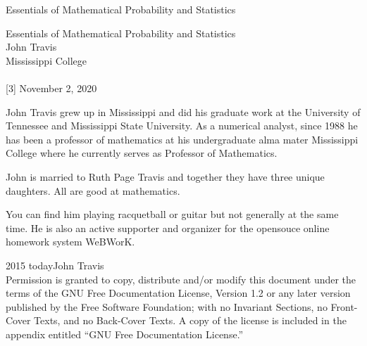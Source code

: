 \documentclass[oneside,10pt,]{book}
\newcommand{\titlepagefont}{\relax}
\numberwithin{equation}{section}
\begin{document}
\frontmatter
\thispagestyle{empty}
{\titlepagefont\centering
\vspace*{0.28\textheight}
{\Huge Essentials of Mathematical Probability and Statistics}\\}
\clearpage
\thispagestyle{empty}
{\titlepagefont\centering
\vspace*{0.14\textheight}
{\Huge Essentials of Mathematical Probability and Statistics}\\[3\baselineskip]
{\Large John Travis}\\[0.5\baselineskip]
{\Large Mississippi College}\\[3\baselineskip]
{\Large }\\[0.5\baselineskip]
[3\baselineskip]
{\Large November 2, 2020}\\}
\clearpage
\thispagestyle{empty}
\hypertarget{g:colophon:idp1}{}\noindent
John Travis grew up in Mississippi and did his graduate work at the University of Tennessee and Mississippi State University. As a numerical analyst, since 1988 he has been a professor of mathematics at his undergraduate alma mater Mississippi College where he currently serves as Professor of Mathematics.%
\par
John is married to Ruth Page Travis and together they have three unique daughters.  All are good at mathematics.%
\par
You can find him playing racquetball or guitar but not generally at the same time. He is also an active supporter and organizer for the opensouce online homework system WeBWorK.%
\par
{}
\noindent\textcopyright{}2015 \textendash{}today\quad{}John Travis\\[0.5\baselineskip]
Permission is granted to copy, distribute and\slash{}or modify this document under the terms of the GNU Free Documentation License, Version 1.2 or any later version published by the Free Software Foundation; with no Invariant Sections, no Front-Cover Texts, and no Back-Cover Texts.  A copy of the license is included in the appendix entitled ``GNU Free Documentation License.''\par\medskip
{}
\end{document}
